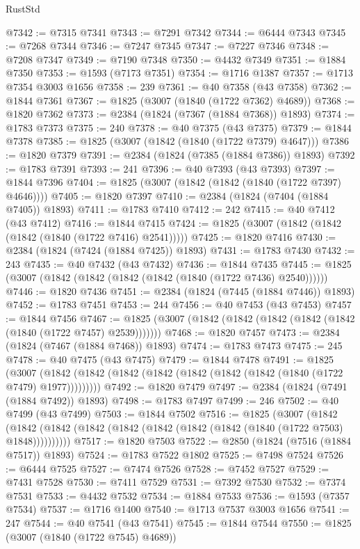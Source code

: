 \begin{lexlean}{RustStd}
\begin{coremodule}
@7342 := @7315 @7341
@7343 := @7291 @7342
@7344 := @6444 @7343
@7345 := @7268 @7344
@7346 := @7247 @7345
@7347 := @7227 @7346
@7348 := @7208 @7347
@7349 := @7190 @7348
@7350 := @4432 @7349
@7351 := @1884 @7350
@7353 := @1593 (@7173 @7351)
@7354 := @1716 @1387
@7357 := @1713 @7354 @3003 @1656
@7358 := 239
@7361 := @40 @7358 (@43 @7358)
@7362 := @1844 @7361
@7367 := @1825 (@3007 (@1840 (@1722 @7362) @4689))
@7368 := @1820 @7362
@7373 := @2384 (@1824 (@7367 (@1884 @7368)) @1893)
@7374 := @1783 @7373
@7375 := 240
@7378 := @40 @7375 (@43 @7375)
@7379 := @1844 @7378
@7385 := @1825 (@3007 (@1842 (@1840 (@1722 @7379) @4647)))
@7386 := @1820 @7379
@7391 := @2384 (@1824 (@7385 (@1884 @7386)) @1893)
@7392 := @1783 @7391
@7393 := 241
@7396 := @40 @7393 (@43 @7393)
@7397 := @1844 @7396
@7404 := @1825 (@3007 (@1842 (@1842 (@1840 (@1722 @7397) @4646))))
@7405 := @1820 @7397
@7410 := @2384 (@1824 (@7404 (@1884 @7405)) @1893)
@7411 := @1783 @7410
@7412 := 242
@7415 := @40 @7412 (@43 @7412)
@7416 := @1844 @7415
@7424 := @1825 (@3007 (@1842 (@1842 (@1842 (@1840 (@1722 @7416) @2541)))))
@7425 := @1820 @7416
@7430 := @2384 (@1824 (@7424 (@1884 @7425)) @1893)
@7431 := @1783 @7430
@7432 := 243
@7435 := @40 @7432 (@43 @7432)
@7436 := @1844 @7435
@7445 := @1825 (@3007 (@1842 (@1842 (@1842 (@1842 (@1840 (@1722 @7436) @2540))))))
@7446 := @1820 @7436
@7451 := @2384 (@1824 (@7445 (@1884 @7446)) @1893)
@7452 := @1783 @7451
@7453 := 244
@7456 := @40 @7453 (@43 @7453)
@7457 := @1844 @7456
@7467 := @1825 (@3007 (@1842 (@1842 (@1842 (@1842 (@1842 (@1840 (@1722 @7457) @2539)))))))
@7468 := @1820 @7457
@7473 := @2384 (@1824 (@7467 (@1884 @7468)) @1893)
@7474 := @1783 @7473
@7475 := 245
@7478 := @40 @7475 (@43 @7475)
@7479 := @1844 @7478
@7491 := @1825
    (@3007 (@1842 (@1842 (@1842 (@1842 (@1842 (@1842 (@1842 (@1840 (@1722 @7479) @1977)))))))))
@7492 := @1820 @7479
@7497 := @2384 (@1824 (@7491 (@1884 @7492)) @1893)
@7498 := @1783 @7497
@7499 := 246
@7502 := @40 @7499 (@43 @7499)
@7503 := @1844 @7502
@7516 := @1825
    (@3007
      (@1842 (@1842 (@1842 (@1842 (@1842 (@1842 (@1842 (@1842 (@1840 (@1722 @7503) @1848))))))))))
@7517 := @1820 @7503
@7522 := @2850 (@1824 (@7516 (@1884 @7517)) @1893)
@7524 := @1783 @7522 @1802
@7525 := @7498 @7524
@7526 := @6444 @7525
@7527 := @7474 @7526
@7528 := @7452 @7527
@7529 := @7431 @7528
@7530 := @7411 @7529
@7531 := @7392 @7530
@7532 := @7374 @7531
@7533 := @4432 @7532
@7534 := @1884 @7533
@7536 := @1593 (@7357 @7534)
@7537 := @1716 @1400
@7540 := @1713 @7537 @3003 @1656
@7541 := 247
@7544 := @40 @7541 (@43 @7541)
@7545 := @1844 @7544
@7550 := @1825 (@3007 (@1840 (@1722 @7545) @4689))

\end{coremodule}
\end{lexlean}
